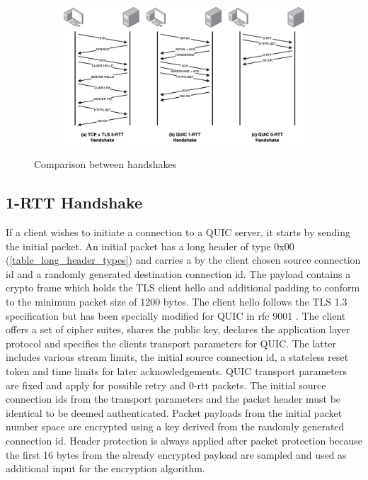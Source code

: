 \begin{figure}[h]
  \centering
  \begin{subfigure}[b]{1.0\textwidth}
    \includegraphics[width=1.0\linewidth]{img/handshake_illustration.jpg}
  \end{subfigure}
  \caption{Comparison between handshakes}
  \label{handshake_comparison}
\end{figure}

\subsection{1-RTT Handshake}

If a client wishes to initiate a connection to a QUIC server, it starts by sending the initial packet. An initial packet has a long header of type 0x00 (\ref{table_long_header_types}) and carries a by the client chosen source connection id and a randomly generated destination connection id. The payload contains a crypto frame which holds the TLS client hello and additional padding to conform to the minimum packet size of 1200 bytes. The client hello follows the TLS 1.3 specification \cite{rfc8446} but has been specially modified for QUIC in rfc 9001 \cite{rfc9001}. The client offers a set of cipher suites, shares the public key, declares the application layer protocol and specifies the clients transport parameters for QUIC. The latter includes various stream limits, the initial source connection id, a stateless reset token and time limits for later acknowledgements. QUIC transport parameters are fixed and apply for possible retry and 0-rtt packets. The initial source connection ids from the transport parameters and the packet header must be identical to be deemed authenticated. Packet payloads from the initial packet number space are encrypted using a key derived from the randomly generated connection id. Header protection is always applied after packet protection because the first 16 bytes from the already encrypted payload are sampled and used as additional input for the encryption algorithm. \\ 

